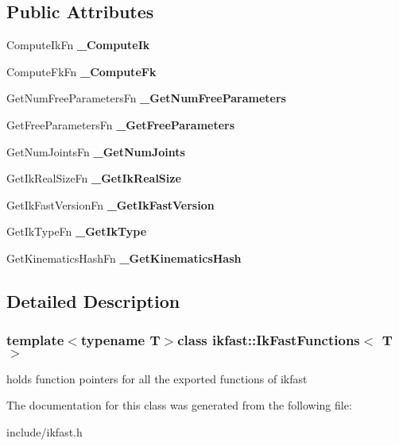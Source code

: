 \subsection*{Public Attributes}
\begin{DoxyCompactItemize}
\item 
Compute\-Ik\-Fn {\bfseries \-\_\-\-Compute\-Ik}\label{classikfast_1_1_ik_fast_functions_a75775a9a8c284f52cb6cc473c434163c}

\item 
Compute\-Fk\-Fn {\bfseries \-\_\-\-Compute\-Fk}\label{classikfast_1_1_ik_fast_functions_a5a30a89afe6314eb86a05c3bd5a1a303}

\item 
Get\-Num\-Free\-Parameters\-Fn {\bfseries \-\_\-\-Get\-Num\-Free\-Parameters}\label{classikfast_1_1_ik_fast_functions_ac78c6f4a428df5b34944510af3abd68f}

\item 
Get\-Free\-Parameters\-Fn {\bfseries \-\_\-\-Get\-Free\-Parameters}\label{classikfast_1_1_ik_fast_functions_a2c57255d31921839afb1ed5c5f86c7cc}

\item 
Get\-Num\-Joints\-Fn {\bfseries \-\_\-\-Get\-Num\-Joints}\label{classikfast_1_1_ik_fast_functions_aa7aadc4d797b2ecc3811a7887b0b0dfc}

\item 
Get\-Ik\-Real\-Size\-Fn {\bfseries \-\_\-\-Get\-Ik\-Real\-Size}\label{classikfast_1_1_ik_fast_functions_a6e0b57e5123af02f5d27c894eac23181}

\item 
Get\-Ik\-Fast\-Version\-Fn {\bfseries \-\_\-\-Get\-Ik\-Fast\-Version}\label{classikfast_1_1_ik_fast_functions_a1deac46b905d3d6fa2186e4fb52a75a4}

\item 
Get\-Ik\-Type\-Fn {\bfseries \-\_\-\-Get\-Ik\-Type}\label{classikfast_1_1_ik_fast_functions_a22b3424efa52b1c611ad6ec426259aca}

\item 
Get\-Kinematics\-Hash\-Fn {\bfseries \-\_\-\-Get\-Kinematics\-Hash}\label{classikfast_1_1_ik_fast_functions_a838b34f459abceb7b0f537ad3d4f834b}

\end{DoxyCompactItemize}


\subsection{Detailed Description}
\subsubsection*{template$<$typename T$>$class ikfast\-::\-Ik\-Fast\-Functions$<$ T $>$}

holds function pointers for all the exported functions of ikfast 

The documentation for this class was generated from the following file\-:\begin{DoxyCompactItemize}
\item 
include/ikfast.\-h\end{DoxyCompactItemize}
